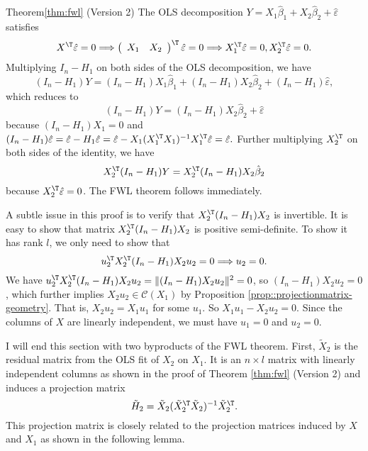 \begin{myproof}{Theorem}{\ref{thm:fwl}} (Version 2)
The OLS decomposition $Y =X_{1}\hat{\beta}_{1}+X_{2}\hat{\beta}_{2}+\hat{\varepsilon}$
satisfies 
\[
X^{\T}\hat{\varepsilon}=0\Longrightarrow\left(\begin{array}{cc}
X_{1} & X_{2}\end{array}\right)^{\T}\hat{\varepsilon}=0\Longrightarrow X_{1}^{\T}\hat{\varepsilon}=0,X_{2}^{\T}\hat{\varepsilon}=0.
\]
Multiplying $I_{n}-H_{1}$ on both sides of the OLS decomposition,
we have
\[
(I_{n}-H_{1}) Y =(I_{n}-H_{1})X_{1}  \hat{\beta}_1 +(I_{n}-H_{1})X_{2} \hat{\beta}_2 +(I_{n}-H_{1})\hat{\varepsilon},
\]
which reduces to 
$$
(I_{n}-H_{1})Y=(I_{n}-H_{1})X_{2}\hat{\beta}_{2}+\hat{\varepsilon}
$$
because $(I_{n}-H_{1})X_{1}=0$ and 
$
(I_{n}-H_{1})\hat{\varepsilon}=\hat{\varepsilon}-H_{1}\hat{\varepsilon}=\hat{\varepsilon}-X_{1}(X_{1}^{\T}X_{1})^{-1}X_{1}^{\T}\hat{\varepsilon}=\hat{\varepsilon}.
$
Further multiplying $X_2^{\T}$ on both sides of the identity, we have
$$
X_2^{\T}(I_{n}-H_{1})Y=X_2^{\T}(I_{n}-H_{1})X_{2}\hat{\beta}_{2}
$$
because $X_{2}^{\T}\hat{\varepsilon}=0$. 
The FWL theorem follows immediately. 

A subtle issue in this proof is to verify that $X_{2}^{\T}(I_{n}-H_{1})X_{2}$ is invertible. It is easy to show that matrix $X_{2}^{\T}(I_{n}-H_{1})X_{2}$ is positive semi-definite. To show it has rank $l$, we only need to show that 
$$
u_{2}^{\T}X_{2}^{\T}(I_{n}-H_{1})X_{2}u_{2}  =0 \Longrightarrow u_2 = 0.
$$
We have $u_{2}^{\T}X_{2}^{\T}(I_{n}-H_{1})X_{2}u_{2}   = \|(I_{n}-H_{1})X_{2}u_{2} \|^2=0$, so $(I_{n}-H_{1})X_{2}u_{2} = 0$, which further implies $X_{2}u_{2}\in\mathcal{C}(X_{1})$ by Proposition \ref{prop::projectionmatrix-geometry}. That is, $ X_{2}u_{2} = X_1 u_1$ for some $u_1$. So $X_1 u_1 - X_2 u_2 = 0$. Since the columns of $X$ are linearly independent, we must have $u_1 = 0$ and $u_2 = 0$. 
\end{myproof}

 


I will end this section with two byproducts of the FWL theorem. First, $\tilde{X}_{2}$ is the residual matrix from the OLS fit of $X_2$ on $X_1$. It is an $n\times l$ matrix with linearly independent columns as shown in the proof of Theorem \ref{thm:fwl} (Version 2)  and induces a projection matrix
$$
\tilde{H}_2 = \tilde{X}_{2} (\tilde{X}_{2}^{\T} \tilde{X}_{2})^{-1} \tilde{X}_{2}^{\T}. 
$$
This projection matrix is closely related to the projection matrices induced by $X$ and $X_1$ as shown in the following lemma. 

